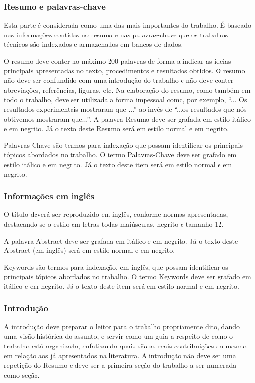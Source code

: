 \documentclass[portugues]{sobraep}
\begin{document}
\subsubsection{Resumo e palavras-chave}
Esta parte é considerada como uma das mais importantes do trabalho. É baseado nas informações contidas no resumo e nas palavras-chave que os trabalhos técnicos são indexados e armazenados em bancos de dados.

O resumo deve conter no máximo 200 palavras de forma a indicar as ideias principais apresentadas no texto, procedimentos e resultados obtidos. O resumo não deve ser confundido com uma introdução do trabalho e não deve conter abreviações, referências, figuras, etc. Na elaboração do resumo, como também em todo o trabalho, deve ser utilizada a forma impessoal como, por exemplo, ``... Os resultados experimentais mostraram que ...'' ao invés de ``...os resultados que nós obtivemos mostraram que...''. A palavra Resumo deve ser grafada em estilo itálico e em negrito. Já o texto deste Resumo será em estilo normal e em negrito.

Palavras-Chave são termos para indexação que possam identificar os principais tópicos abordados no trabalho. O termo Palavras-Chave deve ser grafado em estilo itálico e em negrito. Já o texto deste item será em estilo normal e em negrito.

\subsubsection{Informações em inglês}
O título deverá ser reproduzido em inglês, conforme normas apresentadas, destacando-se o estilo em letras todas maiúsculas, negrito e tamanho 12.

A palavra Abstract deve ser grafada em itálico e em negrito. Já o texto deste Abstract (em inglês) será em estilo normal e em negrito.

Keywords são termos para indexação, em inglês, que possam identificar os principais tópicos abordados no trabalho. O termo Keywords deve ser grafado em itálico e em negrito. Já o texto deste item será em estilo normal e em negrito.

\subsubsection{Introdução}
A introdução deve preparar o leitor para o trabalho propriamente dito, dando uma visão histórica do assunto, e servir como um guia a respeito de como o trabalho está organizado, enfatizando quais são as reais contribuições do mesmo em relação aos já apresentados na literatura. A introdução não deve ser uma repetição do Resumo e deve ser a primeira seção do trabalho a ser numerada como seção.
\end{document}
